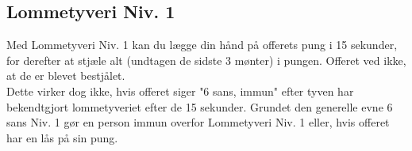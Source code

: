 \subsection{Lommetyveri Niv. 1}
Med Lommetyveri Niv. 1 kan du lægge din hånd på offerets pung i 15 sekunder, for derefter at stjæle alt (undtagen de sidste 3 mønter) i pungen. Offeret ved ikke, at de er blevet bestjålet. \\
Dette virker dog ikke, hvis offeret siger "6 sans, immun" efter tyven har bekendtgjort lommetyveriet efter de 15 sekunder. Grundet den generelle evne 6 sans Niv. 1 gør en person immun overfor Lommetyveri Niv. 1 eller, hvis offeret har en lås på sin pung.